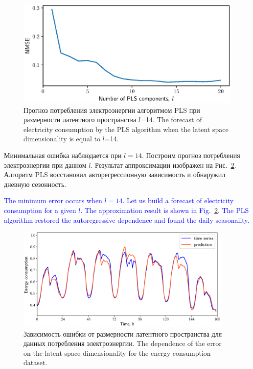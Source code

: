 \documentclass[12pt,twoside]{article}
\begin{document}
\begin{figure}[!h]
	\centering
	\includegraphics[width=0.75\linewidth]{figs/energy_n_comp}
	\caption{Прогноз потребления электроэнергии алгоритмом PLS при размерности латентного пространства $l$=14. The forecast of electricity consumption by the PLS algorithm when the latent space dimensionality is equal to $l$=14.}
	\label{fig::energy_n_comp}
\end{figure}

Минимальная ошибка наблюдается при $l=14$. 
Построим прогноз потребления электроэнергии при данном $l$. 
Результат аппроксимации изображен на Рис.~\ref{fig::energy_prediction}. 
Алгоритм PLS восстановил авторегрессионную зависимость и обнаружил дневную сезонность.

\textcolor{blue}{
The minimum error occurs when $l=14$. 
Let us build a forecast of electricity consumption for a given $l$. 
The approximation result is shown in Fig.~\ref{fig::energy_prediction}. 
The PLS algorithm restored the autoregressive dependence and found the daily seasonality.}

\begin{figure}[!h]
	\centering
	\includegraphics[width=0.95\textwidth]{figs/energy_prediction}
	\caption{Зависимость ошибки от размерности латентного пространства для данных потребления электроэнергии. The dependence of the error on the latent space dimensionality for the energy consumption dataset.}
	\label{fig::energy_prediction}
\end{figure}
\end{document}
